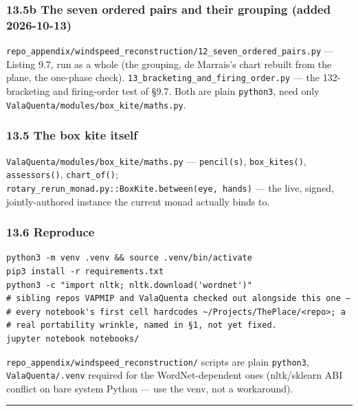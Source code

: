 \documentclass[
  10pt,
]{article}
\begin{document}
\hypertarget{b-the-seven-ordered-pairs-and-their-grouping-added-2026-10-13}{%
\subsubsection{13.5b The seven ordered pairs and their grouping (added
2026-10-13)}\label{b-the-seven-ordered-pairs-and-their-grouping-added-2026-10-13}}

\texttt{repo\_appendix/windspeed\_reconstruction/12\_seven\_ordered\_pairs.py}
--- Listing 9.7, run as a whole (the grouping, de Marrais's chart
rebuilt from the plane, the one-phase check).
\texttt{13\_bracketing\_and\_firing\_order.py} --- the 132-bracketing
and firing-order test of §9.7. Both are plain \texttt{python3}, need
only \texttt{ValaQuenta/modules/box\_kite/maths.py}.

\hypertarget{the-box-kite-itself}{%
\subsubsection{13.5 The box kite itself}\label{the-box-kite-itself}}

\texttt{ValaQuenta/modules/box\_kite/maths.py} --- \texttt{pencil(s)},
\texttt{box\_kites()}, \texttt{assessors()}, \texttt{chart\_of()};
\texttt{rotary\_rerun\_monad.py::BoxKite.between(eye,\ hands)} --- the
live, signed, jointly-authored instance the current monad actually binds
to.

\hypertarget{reproduce}{%
\subsubsection{13.6 Reproduce}\label{reproduce}}

\begin{verbatim}
python3 -m venv .venv && source .venv/bin/activate
pip3 install -r requirements.txt
python3 -c "import nltk; nltk.download('wordnet')"
# sibling repos VAPMIP and ValaQuenta checked out alongside this one —
# every notebook's first cell hardcodes ~/Projects/ThePlace/<repo>; a
# real portability wrinkle, named in §1, not yet fixed.
jupyter notebook notebooks/
\end{verbatim}

\texttt{repo\_appendix/windspeed\_reconstruction/} scripts are plain
\texttt{python3}, \texttt{ValaQuenta/.venv} required for the
WordNet-dependent ones (nltk/sklearn ABI conflict on bare system Python
--- use the venv, not a workaround).

\begin{center}\rule{0.5\linewidth}{0.5pt}\end{center}
\end{document}
